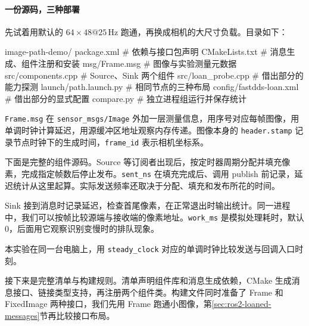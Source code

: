 \paragraph*{一份源码，三种部署}
\begin{example}
先试着用默认的 $64\times48@25\,\mathrm{Hz}$ 跑通，再换成相机的大尺寸负载。目录如下：
\par\medskip\noindent\begin{minipage}{\linewidth}
\begin{tbash}
image-path-demo/
  package.xml             # 依赖与接口包声明
  CMakeLists.txt          # 消息生成、组件注册和安装
  msg/Frame.msg           # 图像与实验测量元数据
  src/components.cpp     # Source、Sink 两个组件
  src/loan_probe.cpp     # 借出部分的能力探测
  launch/path.launch.py  # 相同节点的三种布局
  config/fastdds-loan.xml # 借出部分的显式配置
  compare.py             # 独立进程组运行并保存统计
\end{tbash}
\end{minipage}\par\smallskip

\texttt{Frame.msg} 在 \texttt{sensor\_msgs/Image} 外加一层测量信息，用序号对应每帧图像，用单调时钟计算延迟，用源缓冲区地址观察内存传递。图像本身的 \texttt{header.stamp} 记录节点时钟下的生成时间，\texttt{frame\_id} 表示相机坐标系。
\par\medskip\noindent\begin{minipage}{\linewidth}

\end{minipage}\par\smallskip

下面是完整的组件源码。Source 等订阅者出现后，按定时器周期分配并填充像素，完成指定帧数后停止发布。\texttt{sent\_ns} 在填充完成后、调用 publish 前记录，延迟统计从这里起算。实际发送频率还取决于分配、填充和发布所花的时间。


Sink 接到消息时记录延迟，检查首尾像素，在正常退出时输出统计。同一进程中，我们可以按帧比较源端与接收端的像素地址。\texttt{work\_ms} 是模拟处理耗时，默认 0，后面用它观察识别变慢时的排队现象。


本实验在同一台电脑上，用 \texttt{steady\_clock} 对应的单调时钟比较发送与回调入口时刻。

接下来是完整清单与构建规则。清单声明组件库和消息生成依赖，CMake 生成消息接口、链接类型支持，再注册两个组件类。构建文件同时准备了 Frame 和 FixedImage 两种接口，我们先用 Frame 跑通小图像，第\ref{sec:ros2-loaned-messages}节再比较接口布局。



\end{example}


